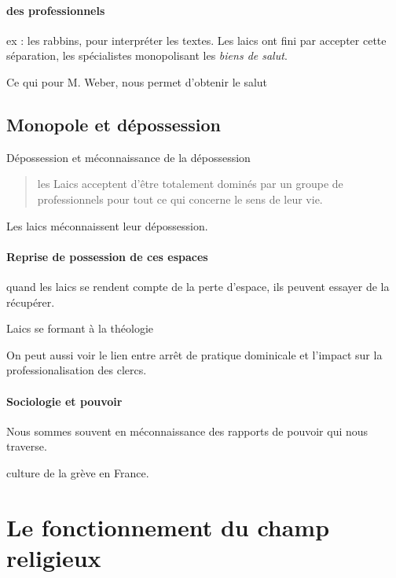 \paragraph{des professionnels} ex : les rabbins, pour interpréter les textes. Les laics ont fini par accepter cette séparation, les spécialistes monopolisant les \textit{biens de salut}. 
\begin{Def}
    Ce qui pour M. Weber, nous permet d'obtenir le salut
\end{Def}



 \subsection{Monopole et dépossession }

 Dépossession et méconnaissance de la dépossession


\begin{quote}
    les Laics acceptent d'être totalement dominés par un groupe de professionnels pour tout ce qui concerne le sens de leur vie.  
\end{quote}
Les laics méconnaissent leur dépossession. 

\paragraph{Reprise de possession de ces espaces} quand les laics se rendent compte de la perte d'espace, ils peuvent essayer de la récupérer.
\begin{Ex}
    Laics se formant à la théologie

    
    On peut aussi voir le lien entre arrêt de pratique dominicale et l'impact sur la professionalisation des clercs.
\end{Ex}

\paragraph{Sociologie et pouvoir} Nous sommes souvent en méconnaissance des rapports de pouvoir qui nous traverse.
\begin{Ex}
    culture de la grève en France. 
\end{Ex}


 \section{Le fonctionnement du champ religieux}


